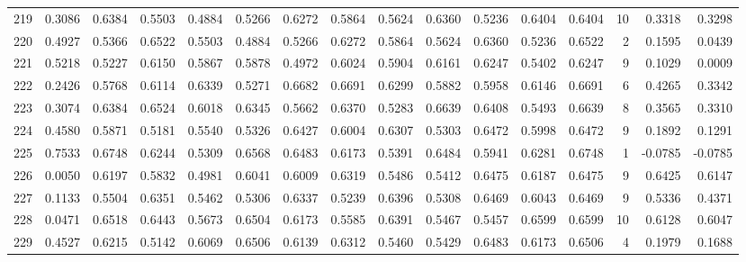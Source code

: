\begin{tabular}{lrrrrrrrrrrrrrrr}
219 &      0.3086 &  0.6384 &  0.5503 &  0.4884 &  0.5266 &  0.6272 &  0.5864 &  0.5624 &  0.6360 &  0.5236 &   0.6404 &     0.6404 &     10 &                    0.3318 &                     0.3298 \\
220 &      0.4927 &  0.5366 &  0.6522 &  0.5503 &  0.4884 &  0.5266 &  0.6272 &  0.5864 &  0.5624 &  0.6360 &   0.5236 &     0.6522 &      2 &                    0.1595 &                     0.0439 \\
221 &      0.5218 &  0.5227 &  0.6150 &  0.5867 &  0.5878 &  0.4972 &  0.6024 &  0.5904 &  0.6161 &  0.6247 &   0.5402 &     0.6247 &      9 &                    0.1029 &                     0.0009 \\
222 &      0.2426 &  0.5768 &  0.6114 &  0.6339 &  0.5271 &  0.6682 &  0.6691 &  0.6299 &  0.5882 &  0.5958 &   0.6146 &     0.6691 &      6 &                    0.4265 &                     0.3342 \\
223 &      0.3074 &  0.6384 &  0.6524 &  0.6018 &  0.6345 &  0.5662 &  0.6370 &  0.5283 &  0.6639 &  0.6408 &   0.5493 &     0.6639 &      8 &                    0.3565 &                     0.3310 \\
224 &      0.4580 &  0.5871 &  0.5181 &  0.5540 &  0.5326 &  0.6427 &  0.6004 &  0.6307 &  0.5303 &  0.6472 &   0.5998 &     0.6472 &      9 &                    0.1892 &                     0.1291 \\
225 &      0.7533 &  0.6748 &  0.6244 &  0.5309 &  0.6568 &  0.6483 &  0.6173 &  0.5391 &  0.6484 &  0.5941 &   0.6281 &     0.6748 &      1 &                   -0.0785 &                    -0.0785 \\
226 &      0.0050 &  0.6197 &  0.5832 &  0.4981 &  0.6041 &  0.6009 &  0.6319 &  0.5486 &  0.5412 &  0.6475 &   0.6187 &     0.6475 &      9 &                    0.6425 &                     0.6147 \\
227 &      0.1133 &  0.5504 &  0.6351 &  0.5462 &  0.5306 &  0.6337 &  0.5239 &  0.6396 &  0.5308 &  0.6469 &   0.6043 &     0.6469 &      9 &                    0.5336 &                     0.4371 \\
228 &      0.0471 &  0.6518 &  0.6443 &  0.5673 &  0.6504 &  0.6173 &  0.5585 &  0.6391 &  0.5467 &  0.5457 &   0.6599 &     0.6599 &     10 &                    0.6128 &                     0.6047 \\
229 &      0.4527 &  0.6215 &  0.5142 &  0.6069 &  0.6506 &  0.6139 &  0.6312 &  0.5460 &  0.5429 &  0.6483 &   0.6173 &     0.6506 &      4 &                    0.1979 &                     0.1688 \\

\end{tabular}

